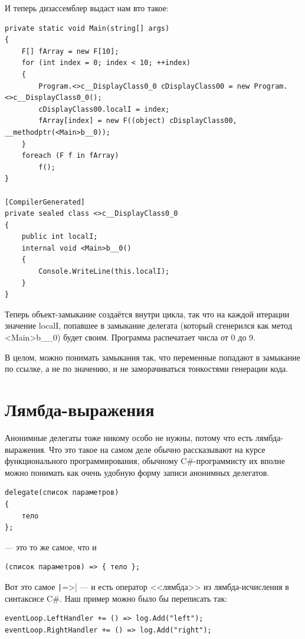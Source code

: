 \documentclass{../../text-style}
\begin{document}
И теперь дизассемблер выдаст нам вто такое:

\begin{verbatim}
private static void Main(string[] args)
{
    F[] fArray = new F[10];
    for (int index = 0; index < 10; ++index)
    {
        Program.<>c__DisplayClass0_0 cDisplayClass00 = new Program.<>c__DisplayClass0_0();
        cDisplayClass00.localI = index;
        fArray[index] = new F((object) cDisplayClass00, __methodptr(<Main>b__0));
    }
    foreach (F f in fArray)
        f();
}

[CompilerGenerated]
private sealed class <>c__DisplayClass0_0
{
    public int localI;
    internal void <Main>b__0()
    {
        Console.WriteLine(this.localI);
    }
}
\end{verbatim}

Теперь объект-замыкание создаётся внутри цикла, так что на каждой итерации значение localI, попавшее в замыкание делегата (который сгенерился как метод <Main>b\_\_0) будет своим. Программа распечатает числа от 0 до 9. 

В целом, можно понимать замыкания так, что переменные попадают в замыкание по ссылке, а не по значению, и не заморачиваться тонкостями генерации кода.

\section{Лямбда-выражения}

Анонимные делегаты тоже никому особо не нужны, потому что есть лямбда-выражения. Что это такое на самом деле обычно рассказывают на курсе функционального программирования, обычному C\#-программисту их вполне можно понимать как очень удобную форму записи анонимных делегатов.

\begin{verbatim}
delegate(список параметров)
{
    тело
};
\end{verbatim}

--- это то же самое, что и 
\begin{verbatim}
(список параметров) => { тело };
\end{verbatim}

Вот это самое \texttt|=>| --- и есть оператор <<лямбда>> из лямбда-исчисления в синтаксисе C\#. Наш пример можно было бы переписать так:

\begin{verbatim}
eventLoop.LeftHandler += () => log.Add("left");
eventLoop.RightHandler += () => log.Add("right");
\end{verbatim}
\end{document}
